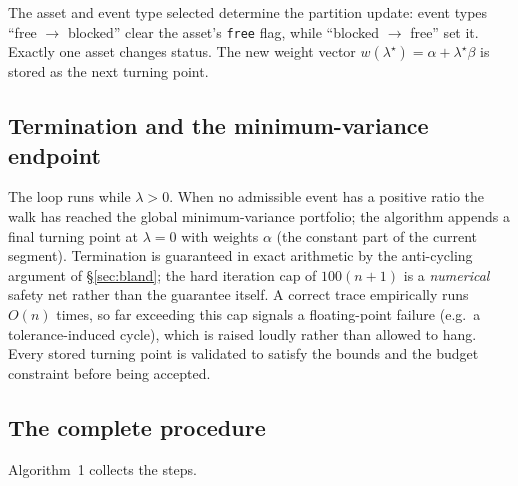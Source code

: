 \documentclass[11pt]{article}
\begin{document}
The asset and event type selected determine the partition update: event types
``free $\to$ blocked'' clear the asset's \texttt{free} flag, while ``blocked $\to$ free''
set it. Exactly one asset changes status. The new weight vector
$w(\lambda^{\star}) = \alpha + \lambda^{\star}\beta$ is stored as the next turning
point.

\subsection{Termination and the minimum-variance endpoint}

The loop runs while $\lambda > 0$. When no admissible event has a positive ratio the
walk has reached the global minimum-variance portfolio; the algorithm appends a final
turning point at $\lambda = 0$ with weights $\alpha$ (the constant part of the current
segment). Termination is guaranteed in exact arithmetic by the anti-cycling argument of
\S\ref{sec:bland}; the hard iteration cap of $100(n+1)$ is a \emph{numerical} safety net
rather than the guarantee itself. A correct trace empirically runs $O(n)$ times, so far
exceeding this cap signals a floating-point failure (e.g.\ a tolerance-induced cycle),
which is raised loudly rather than allowed to hang. Every stored turning point is validated to satisfy the bounds and the
budget constraint before being accepted.

\subsection{The complete procedure}

Algorithm~1 collects the steps.
\end{document}
